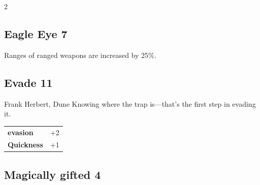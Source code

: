 \begin{multicols}{2}
\begin{tcolorbox}
\vspace{3mm}



\end{tcolorbox}

\begin{tcolorbox}
    \subsection*{Eagle Eye \hfill \small{7 }}
    \tcblower
Ranges of ranged weapons are increased by 25\%.


\vspace{3mm}



\end{tcolorbox}

\begin{tcolorbox}
    \subsection*{Evade \hfill \small{11 }}
    \tcblower


\begin{pquote}{Frank Herbert, Dune}
Knowing where the trap is—that's the first step in evading it.
\end{pquote}

\vspace{3mm}

\begin{tabular}{@{}ll@{}}
    \textbf{evasion} & +2\\
    \textbf{Quickness} & +1\\
\end{tabular}


\end{tcolorbox}

\begin{tcolorbox}
    \subsection*{Magically gifted \hfill \small{4 }}
    \tcblower



\end{tcolorbox}
\end{multicols}
